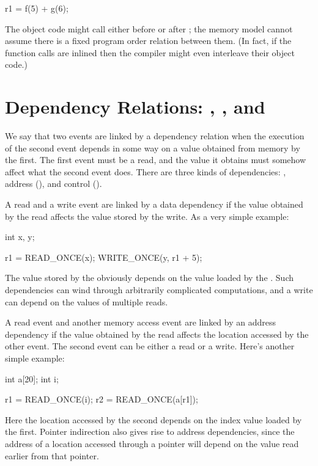 \begin{VerbatimU}
	r1 = f(5) + g(6);
\end{VerbatimU}

The object code might call  either before or after ; the
memory model cannot assume there is a fixed program order relation
between them.
(In fact, if the function calls are inlined then the compiler might
even interleave their object code.)


\section{Dependency Relations: , , and }
\label{sec:docs:explanation:Dependency Relations: data, addr, and ctrl}

We say that two events are linked by a dependency relation when the
execution of the second event depends in some way on a value obtained
from memory by the first.
The first event must be a read, and the value it obtains must somehow
affect what the second event does.
There are three kinds of dependencies: , address (),
and control ().

A read and a write event are linked by a data dependency if the value
obtained by the read affects the value stored by the write.
As a very simple example:

\begin{VerbatimU}
	int x, y;

	r1 = READ_ONCE(x);
	WRITE_ONCE(y, r1 + 5);
\end{VerbatimU}

The value stored by the  obviously depends on the value
loaded by the .
Such dependencies can wind through arbitrarily complicated
computations, and a write can depend on the values of multiple reads.

A read event and another memory access event are linked by an address
dependency if the value obtained by the read affects the location
accessed by the other event.
The second event can be either a read or a write.
Here's another simple example:

\begin{VerbatimU}
	int a[20];
	int i;

	r1 = READ_ONCE(i);
	r2 = READ_ONCE(a[r1]);
\end{VerbatimU}

Here the location accessed by the second  depends on the
index value loaded by the first.
Pointer indirection also gives rise to address dependencies, since
the address of a location accessed through a pointer will depend on
the value read earlier from that pointer.

